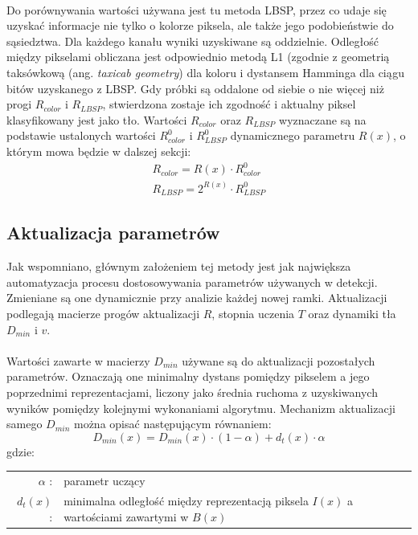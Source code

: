 \paragraph{}
Do porównywania wartości używana jest tu metoda LBSP, przez co udaje się uzyskać informacje nie tylko o kolorze piksela, ale także jego podobieństwie do sąsiedztwa. Dla każdego kanału wyniki uzyskiwane są oddzielnie. Odległość między pikselami obliczana jest odpowiednio metodą L1 (zgodnie z geometrią taksówkową (ang. \textit{taxicab geometry}) dla koloru i dystansem Hamminga dla ciągu bitów uzyskanego z LBSP. Gdy próbki są oddalone od siebie o nie więcej niż progi $R_{color}$ i $R_{LBSP}$, stwierdzona zostaje ich zgodność i aktualny piksel klasyfikowany jest jako tło. Wartości $R_{color}$ oraz $R_{LBSP}$ wyznaczane są na podstawie ustalonych wartości $R_{color}^{0}$ i $R_{LBSP}^{0}$ dynamicznego parametru $R(x)$, o którym mowa będzie w dalszej sekcji:
\begin{gather}
R_{color} = R(x)\cdot R_{color}^{0} \\
R_{LBSP} = 2^{R(x)}\cdot R_{LBSP}^{0}
\end{gather}
\subsection{Aktualizacja parametrów}
Jak wspomniano, głównym założeniem tej metody jest jak największa automatyzacja procesu dostosowywania parametrów używanych w detekcji. Zmieniane są one dynamicznie przy analizie każdej nowej ramki. Aktualizacji podlegają macierze progów aktualizacji $R$, stopnia uczenia $T$ oraz dynamiki tła $D_{min}$ i $v$.
\paragraph{}
Wartości zawarte w macierzy $D_{min}$ używane są do aktualizacji pozostałych parametrów. Oznaczają one minimalny dystans pomiędzy pikselem a jego poprzednimi reprezentacjami, liczony jako średnia ruchoma z uzyskiwanych wyników pomiędzy kolejnymi wykonaniami algorytmu. Mechanizm aktualizacji samego $D_{min}$ można opisać następującym równaniem:
\begin{equation}
D_{min}(x) = D_{min}(x)\cdot (1-\alpha)+d_{t}(x)\cdot \alpha
\end{equation}
gdzie:\\ 
\hspace*{3em}
\begin{tabular}{r l}
$\alpha$ : &  parametr uczący\\
$d_{t}(x)$ : & minimalna odległość między reprezentacją piksela $I(x)$ a wartościami zawartymi w $B(x)$
\end{tabular} \\

